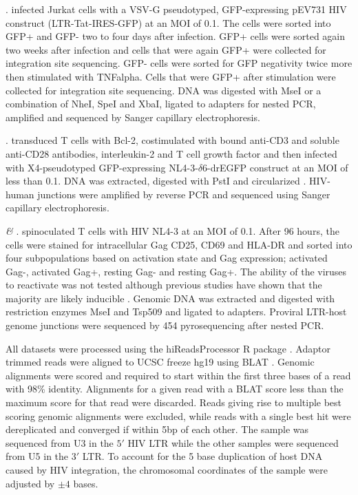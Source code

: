 \documentclass[../sherrill-Mix_thesis.tex]{subfiles}
\begin{document}
		\emph{\Jurkat{}}. \citet{Lewinski2005} infected Jurkat cells with a VSV-G pseudotyped, GFP-expressing pEV731 HIV construct (LTR-Tat-IRES-GFP) \citep{Jordan2001} at an MOI of 0.1. The cells were sorted into GFP+ and GFP- two to four days after infection. GFP+ cells were sorted again two weeks after infection and cells that were again GFP+ were collected for integration site sequencing. GFP- cells were sorted for GFP negativity twice more then stimulated with TNFalpha. Cells that were GFP+ after stimulation were collected for integration site sequencing. DNA was digested with MseI or a combination of NheI, SpeI and XbaI, ligated to adapters for nested PCR, amplified and sequenced by Sanger capillary electrophoresis. 

		\emph{\Bcl{}}. \citet{Shan2011} transduced \cdFour{} T cells with Bcl-2, costimulated with bound anti-CD3 and soluble anti-CD28 antibodies, interleukin-2 and T cell growth factor and then infected with X4-pseudotyped GFP-expressing NL4-3-$\delta$6-drEGFP construct \citep{Mochizuki1998} at an MOI of less than 0.1. DNA was extracted, digested with PstI and circularized \citep{Han2004}. HIV-human junctions were amplified by reverse PCR and sequenced using Sanger capillary electrophoresis.

		\emph{\Active{} \& \Resting{}}. \citet{Pace2012} spinoculated \cdFour{} T cells with HIV NL4-3 at an MOI of 0.1. After 96 hours, the cells were stained for intracellular Gag CD25, CD69 and HLA-DR and sorted into four subpopulations based on activation state and Gag expression; activated Gag-, activated Gag+, resting Gag- and resting Gag+. The ability of the viruses to reactivate was not tested although previous studies have shown that the majority are likely inducible \citep{Plesa2007}. Genomic DNA was extracted and digested with restriction enzymes MseI and Tsp509 and ligated to adapters. Proviral LTR-host genome junctions were sequenced by 454 pyrosequencing after nested PCR.

		All datasets were processed using the hiReadsProcessor R package \citep{Malani}. Adaptor trimmed reads were aligned to UCSC freeze hg19 using BLAT \citep{Kent2002}. Genomic alignments were scored and required to start within the first three bases of a read with 98\% identity. Alignments for a given read with a BLAT score less than the maximum score for that read were discarded.  Reads giving rise to multiple best scoring genomic alignments were excluded, while reads with a single best hit were dereplicated and converged if within 5bp of each other. The \Bcl{} sample was sequenced from U3 in the $5'$ HIV LTR while the other samples were sequenced from U5 in the $3'$ LTR. To account for the 5 base duplication of host DNA caused by HIV integration, the chromosomal coordinates of the \Bcl{} sample were adjusted by $\pm 4$ bases. %
		
\end{document}
